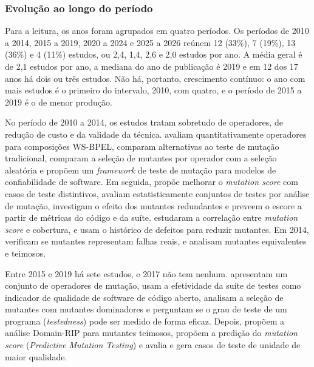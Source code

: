 \subsubsection{Evolução ao longo do período}
\label{subsubsec:evolucao-periodo}

Para a leitura, os anos foram agrupados em quatro períodos. Os períodos de 2010 a 2014, 2015 a 2019, 2020 a 2024 e 2025 a 2026 reúnem 12 (33\%), 7 (19\%), 13 (36\%) e 4 (11\%) estudos, ou 2,4, 1,4, 2,6 e 2,0 estudos por ano. A média geral é de 2,1 estudos por ano, a mediana do ano de publicação é 2019 e em 12 dos 17 anos há dois ou três estudos. Não há, portanto, crescimento contínuo: o ano com mais estudos é o primeiro do intervalo, 2010, com quatro, e o período de 2015 a 2019 é o de menor produção.

No período de 2010 a 2014, os estudos tratam sobretudo de operadores, de redução de custo e da validade da técnica.  avaliam quantitativamente operadores para composições WS-BPEL,  comparam alternativas ao teste de mutação tradicional,  comparam a seleção de mutantes por operador com a seleção aleatória e  propõem um \textit{framework} de teste de mutação para modelos de confiabilidade de software. Em seguida,  propõe melhorar o \textit{mutation score} com casos de teste distintivos,  avaliam estatisticamente conjuntos de testes por análise de mutação,  investigam o efeito dos mutantes redundantes e  preveem o escore a partir de métricas do código e da suíte.  estudaram a correlação entre \textit{mutation score} e cobertura, e  usam o histórico de defeitos para reduzir mutantes. Em 2014,  verificam se mutantes representam falhas reais, e  analisam mutantes equivalentes e teimosos.

Entre 2015 e 2019 há sete estudos, e 2017 não tem nenhum.  apresentam um conjunto de operadores de mutação,  usam a efetividade da suíte de testes como indicador de qualidade de software de código aberto,  analisam a seleção de mutantes com mutantes dominadores e  perguntam se o grau de teste de um programa (\textit{testedness}) pode ser medido de forma eficaz. Depois,  propõem a análise Domain-RIP para mutantes teimosos,  propõem a predição do \textit{mutation score} (\textit{Predictive Mutation Testing}) e  avalia e gera casos de teste de unidade de maior qualidade.

